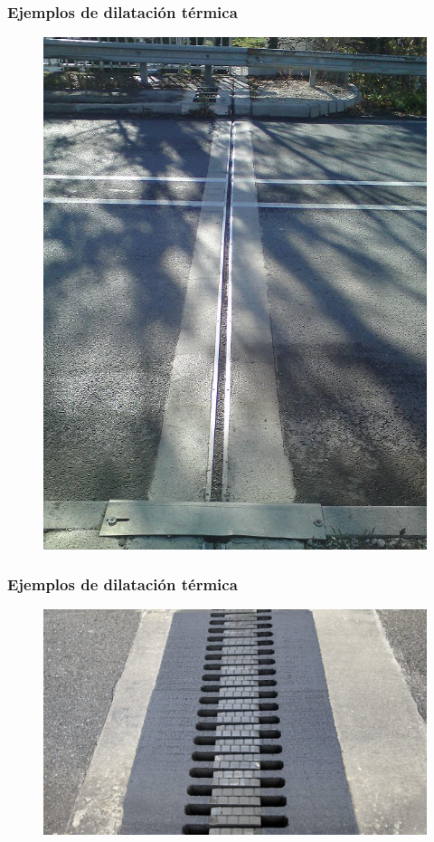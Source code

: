\documentclass[14pt]{beamer}
\begin{document}
\begin{frame}
\frametitle{Ejemplos de dilatación térmica}
\begin{figure}
    \centering
    \includegraphics[scale=0.3]{Imagenes/Dilatacion_01.jpg}
\end{figure}
\end{frame}
\begin{frame}
\frametitle{Ejemplos de dilatación térmica}
\begin{figure}
    \centering
    \includegraphics[scale=0.3]{Imagenes/Dilatacion_02.jpg}
\end{figure}
\end{frame}
\end{document}
